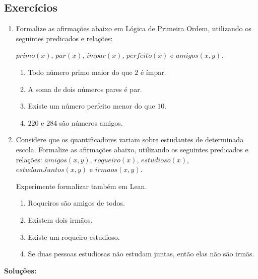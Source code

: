     \subsection{Exercícios}

    \begin{enumerate}
        \item Formalize as afirmações abaixo em Lógica de Primeira Ordem, utilizando os seguintes predicados e relações:
        
        $primo(x)$, $par(x)$, $impar(x)$, $perfeito(x)$ e $amigos(x, y)$.
        \begin{enumerate}
            \item Todo número primo maior do que $2$ é ímpar.
            \item A soma de dois números pares é par.
            \item Existe um número perfeito menor do que $10$.
            \item $220$ e $284$ são números amigos.
        \end{enumerate}
        \item Considere que os quantificadores variam sobre estudantes de determinada escola. Formalize as afirmações abaixo, utilizando os seguintes predicados e relações:
        $amigos(x, y)$, $roqueiro(x)$, $estudioso(x)$, $estudamJuntos(x, y)$ e $irmaos(x, y)$.
        
        Experimente formalizar também em Lean.
        \begin{enumerate}
            \item Roqueiros são amigos de todos.
            \item Existem dois irmãos.
            \item Existe um roqueiro estudioso.
            \item Se duas pessoas estudiosas não estudam juntas, então elas não são irmãs.
        \end{enumerate}
    \end{enumerate}

    \textbf{Soluções:}

